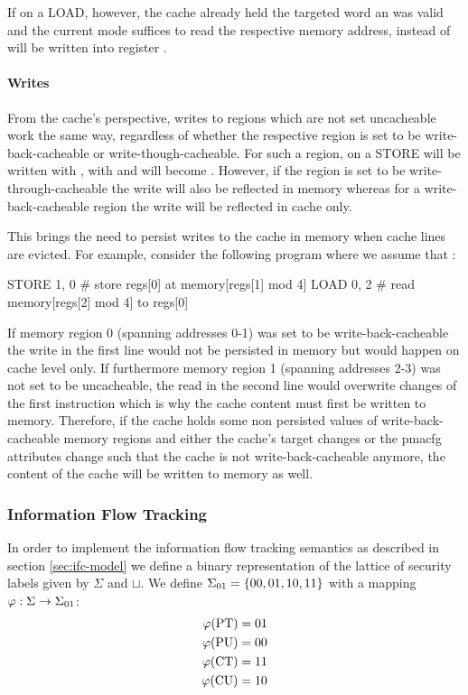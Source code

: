If on a LOAD, however, the cache already held the targeted word an was valid and the current mode suffices to read the respective memory address,  instead of  will be written into register .

\paragraph{Writes}
From the cache's perspective, writes to regions which are not set uncacheable work the same way, regardless of whether the respective region is set to be write-back-cacheable or write-though-cacheable.
For such a region, on a STORE  will be written with ,  with  and  will become .
However, if the region is set to be write-through-cacheable the write will also be reflected in memory whereas for a write-back-cacheable region the write will be reflected in cache only.

This brings the need to persist writes to the cache in memory when cache lines are evicted.
For example, consider the following program where we assume that :
\begin{assmblr}
STORE 1, 0  # store regs[0] at memory[regs[1] mod 4]
LOAD 0, 2   # read memory[regs[2] mod 4] to regs[0]
\end{assmblr}

If memory region 0 (spanning addresses 0-1) was set to be write-back-cacheable the write in the first line would not be persisted in memory but would happen on cache level only.
If furthermore memory region 1 (spanning addresses 2-3) was not set to be uncacheable, the read in the second line would overwrite changes of the first instruction which is why the cache content must first be written to memory.
Therefore, if the cache holds some non persisted values of write-back-cacheable memory regions and either the cache's target changes or the \gls{pmacfg} attributes change such that the cache is not write-back-cacheable anymore, the content of the cache will be written to memory as well.

\subsubsection{Information Flow Tracking}
\label{sec:ifc-implementation}

In order to implement the information flow tracking semantics as described in section \ref{sec:ifc-model} we define a binary representation of the lattice of security labels given by $ \Sigma $ and $ \sqcup $.
We define $ \Sigma_{01} = \{ 00, 01, 10, 11 \}$ with a mapping $ \varphi : \Sigma \rightarrow \Sigma_{01} $:
\begin{align*}
    \varphi(\text{PT}) &= 01 \\
    \varphi(\text{PU}) &= 00 \\
    \varphi(\text{CT}) &= 11 \\
    \varphi(\text{CU}) &= 10
\end{align*}

